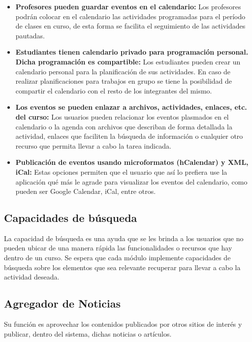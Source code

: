 \begin{itemize}

\item \textbf{Profesores pueden guardar eventos en el calendario:} Los profesores podrán colocar en el calendario las actividades programadas para el período de clases en curso, de esta forma se facilita el seguimiento de las actividades pautadas.

\item \textbf{Estudiantes tienen calendario privado para programación personal. Dicha programación es compartible:} Los estudiantes pueden crear un calendario personal para la planificación de sus actividades. En caso de realizar planificaciones para trabajos en grupo se tiene la posibilidad de compartir el calendario con el resto de los integrantes del mismo.

\item \textbf{Los eventos se pueden enlazar a archivos, actividades, enlaces, etc. del curso:} Los usuarios pueden relacionar los eventos plasmados en el calendario o la agenda con archivos que describan de forma detallada la actividad, enlaces que faciliten la búsqueda de información o cualquier otro recurso que permita llevar a cabo la tarea indicada.

\item \textbf{Publicación de eventos usando microformatos (hCalendar) y XML, iCal:} Estas opciones permiten que el usuario que así lo prefiera use la aplicación qué más le agrade para visualizar los eventos del calendario, como pueden ser Google Calendar, iCal, entre otros.

\end{itemize}

\subsection{Capacidades de búsqueda}

La capacidad de búsqueda es una ayuda que se les brinda a los usuarios que no pueden ubicar de una manera rápida las funcionalidades o recursos que hay dentro de un curso. Se espera que cada módulo implemente capacidades de búsqueda sobre los elementos que sea relevante recuperar para llevar a cabo la actividad deseada.

\subsection{Agregador de Noticias}

Su función es aprovechar los contenidos publicados por otros sitios de interés y publicar, dentro del sistema, dichas noticias o artículos.


